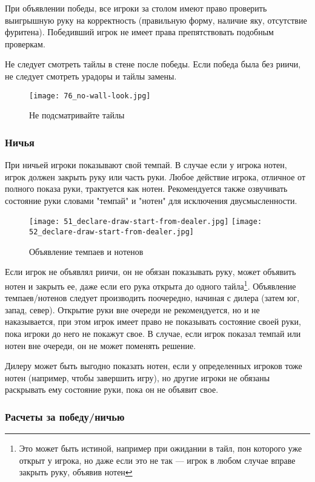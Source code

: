 При объявлении победы, все игроки за столом имеют право проверить выигрышную руку на корректность (правильную форму, наличие яку, отсутствие фуритена). Победивший игрок не имеет права препятствовать подобным проверкам.

Не следует смотреть тайлы в стене после победы. Если победа была без риичи, не следует смотреть урадоры и тайлы замены. 

\begin{figure}[H]
	\centering
	\texttt{[image: 76\_no-wall-look.jpg]}
	\caption{Не подсматривайте тайлы}
\end{figure}

\subsubsection{Ничья}

При ничьей игроки показывают свой темпай. В случае если у игрока нотен, игрок должен закрыть руку или часть руки. Любое действие игрока, отличное от полного показа руки, трактуется как нотен. Рекомендуется также озвучивать состояние руки словами "темпай" и "нотен" для исключения двусмысленности.

\begin{figure}[H]
	\centering
	\texttt{[image: 51\_declare-draw-start-from-dealer.jpg]}
	\texttt{[image: 52\_declare-draw-start-from-dealer.jpg]}
	\caption{Объявление темпаев и нотенов}
\end{figure}

Если игрок не объявлял риичи, он не обязан показывать руку, может объявить нотен и закрыть ее, даже если его рука открыта до одного тайла\footnote{Это может быть истиной, например при ожидании в тайл, пон которого уже открыт у игрока, но даже если это не так --- игрок в любом случае вправе закрыть руку, объявив нотен}. Объявление темпаев/нотенов следует производить поочередно, начиная с дилера (затем юг, запад, север). Открытие руки вне очереди не рекомендуется, но и не наказывается, при этом игрок имеет право не показывать состояние своей руки, пока игроки до него не покажут свое. В случае, если игрок показал темпай или нотен вне очереди, он не может поменять решение.

Дилеру может быть выгодно показать нотен, если у определенных игроков тоже нотен (например, чтобы завершить игру), но другие игроки не обязаны раскрывать ему состояние руки, пока он не объявит свое.

\subsubsection{Расчеты за победу/ничью}

